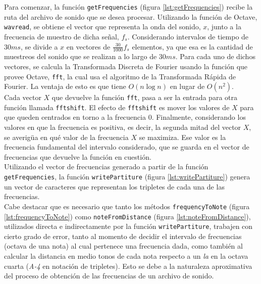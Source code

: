 \documentclass[journal, monochrome]{IEEEtran}
\begin{document}
Para comenzar, la función \texttt{getFrequencies} (figura \ref{lst:getFrequencies}) recibe la ruta del archivo de sonido que se desea procesar. Utilizando la función de Octave, \texttt{wavread}, se obtiene el vector que representa la onda del sonido, $x$, junto a la frecuencia de muestro de dicha señal, $f_{s}$. Considerando intervalos de tiempo de $30 ms$, se divide a $x$ en vectores de $\frac{30}{1000}f_{s}$ elementos, ya que esa es la cantidad de muestreos del sonido que se realizan a lo largo de $30 ms$. Para cada uno de dichos vectores, se calcula la Transformada Discreta de Fourier usando la función que provee Octave, \texttt{fft}, la cual usa el algoritmo de la Transformada Rápida de Fourier. La ventaja de esto es que tiene $O(n\log n)$ en lugar de $O(n^{2})$. \\

Cada vector $X$ que devuelve la función \texttt{fft}, pasa a ser la entrada para otra función llamada \texttt{fftshift}. El efecto de \texttt{fftshift} es mover los valores de $X$ para que queden centrados en torno a la frecuencia $0$. Finalmente, considerando los valores en que la frecuencia es positiva, es decir, la segunda mitad del vector $X$, se averigüa en qué valor de la frecuencia $X$ se maximiza. Ese valor es la frecuencia fundamental del intervalo considerado, que se guarda en el vector de frecuencias que devuelve la función en cuestión.\\

Utilizando el vector de frecuencias generado a partir de la función \texttt{getFrequencies}, la función \texttt{writePartiture} (figura \ref{lst:writePartiture}) genera un vector de caracteres que representan los tripletes de cada una de las frecuencias.\\

Cabe destacar que es necesario que tanto los métodos \texttt{frequencyToNote} (figura \ref{lst:frequencyToNote}) como \texttt{noteFromDistance} (figura \ref{lst:noteFromDistance}), utilizados directa e indirectamente por la función \texttt{writePartiture}, trabajen con cierto grado de error, tanto al momento de decidir el intervalo de frecuencias (octava de una nota) al cual pertenece una frecuencia dada, como también al calcular la distancia en medio tonos de cada nota respecto a un \textit{la} en la octava cuarta (\textit{A-4} en notación de tripletes). Esto se debe a la naturaleza aproximativa del proceso de obtención de las frecuencias de un archivo de sonido.\\
\end{document}
